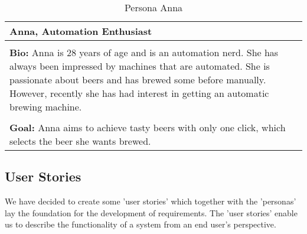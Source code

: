 \begin{table}[H]
    \begin{center}
        \begin{tabular}{|p{16cm}|}
            \hline
            \textbf{Anna, Automation Enthusiast}                                                                                                                                                              \\
            \hline
            \\ \textbf{Bio:} Anna is 28 years of age and is an automation nerd. She has always been impressed by machines that are automated. She is passionate about beers and has brewed some before manually. However, recently she has had interest in getting an automatic brewing machine.  \\
            \\
            \textbf{Goal:} Anna aims to achieve tasty beers with only one click, which selects the beer she wants brewed.\\
            \hline
        \end{tabular}
        \caption{Persona Anna}
        \label{tab:persona_anna}
    \end{center}
\end{table}

\subsection{User Stories}

We have decided to create some 'user stories' which together with the 'personas' lay the foundation for the development of requirements.
The 'user stories' enable us to describe the functionality of a system from an end user's perspective.

